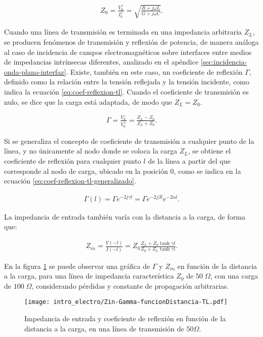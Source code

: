 \begin{align}
	\label{eq:TL-impedancia-caracteristica}
	Z_0 = \frac{V_0^+}{I_0^+} = \sqrt{\frac{R+j\omega L}{G+j\omega C}}.
\end{align}

Cuando una línea de transmisión es terminada en una impedancia arbitraria $Z_L$, se producen fenómenos de transmisión y reflexión de potencia, de manera análoga al caso de incidencia de campos electromagnéticos sobre interfaces entre medios de impedancias intrínsecas diferentes, analizado en el apéndice \ref{sec:incidencia-onda-plana-interfaz}. Existe, también en este caso, un coeficiente de reflexión $\Gamma$, definido como la relación entre la tensión reflejada y la tensión incidente, como indica la ecuación \ref{eq:coef-reflexion-tl}. Cuando el coeficiente de transmisión es nulo, se dice que la carga está adaptada, de modo que $Z_L = Z_0$.

\begin{align}
	\label{eq:coef-reflexion-tl}
	\Gamma = \frac{V_0^-}{V_0^+} = \frac{Z_L-Z_0}{Z_L+Z_0}.
\end{align}

Si se generaliza el concepto de coeficiente de transmisión a cualquier punto de la línea, y no únicamente al nodo donde se coloca la carga $Z_L$, se obtiene el coeficiente de reflexión para cualquier punto $l$ de la línea a partir del que corresponde al nodo de carga, ubicado en la posición 0, como se indica en la ecuación \ref{eq:coef-reflexion-tl-generalizado}.

\begin{align}
\label{eq:coef-reflexion-tl-generalizado}
\Gamma(l) = \Gamma e^{-2j\gamma l} = \Gamma e^{-2j\beta l} e^{-2\alpha l}.
\end{align}

La impedancia de entrada también varía con la distancia a la carga, de forma que:

\begin{align}
Z_{in} = \frac{V(-l)}{I(-l)} = Z_0 \frac{Z_L +Z_0 \tanh \gamma l}{Z_0 + Z_L \tanh \gamma l}.
\end{align}

En la figura \ref{fig:Zin-Gamma-funcionDistancia-TL} se puede observar una gráfica de $\Gamma$ y $Z_{in}$ en función de la distancia a la carga, para una línea de impedancia característica $Z_0$ de $50 \; \Omega$, con una carga de $100 \; \Omega$, considerando pérdidas y constante de propagación arbitrarias.

\begin{figure}[htp]
	\centering
	\texttt{[image: intro\_electro/Zin-Gamma-funcionDistancia-TL.pdf]}
	\caption{Impedancia de entrada y coeficiente de reflexión en función de la distancia a la carga, en una línea de transmisión de $50 \Omega$.}
	\label{fig:Zin-Gamma-funcionDistancia-TL}
\end{figure}

